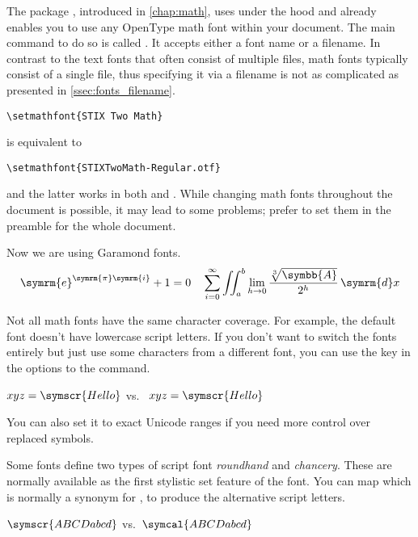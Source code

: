 The package , introduced in \autoref{chap:math}, uses
 under the hood and already enables you to use any OpenType math
font within your document. The main command to do so is called
. It accepts either a font name or a filename. In contrast to
the text fonts that often consist of multiple files, math fonts typically
consist of a single file, thus specifying it via a filename is not as
complicated as presented in \autoref{ssec:fonts_filename}.
\begin{code}
  \begin{verbatim}
\setmathfont{STIX Two Math}
  \end{verbatim}
\end{code}
is equivalent to
\begin{code}
  \begin{verbatim}
\setmathfont{STIXTwoMath-Regular.otf}
  \end{verbatim}
\end{code}
and the latter works in both  and . While
changing math fonts throughout the document is possible, it may lead to some
problems; prefer to set them in the preamble for the whole document.
\begin{example}
\setoperatorfont\symrm%
\setmainfont{Garamond Libre}
Now we are using Garamond fonts.
\[
  \symrm{e}^{\symrm{\pi}
    \symrm{i}} + 1 = 0 \quad
  \sum_{i=0}^\infty \iint_a^b
  \lim_{h\to0}\frac{\sqrt[3]{
    \symbb{A}}}{2^h}\,\symrm{d}x
\]
\end{example}

Not all math fonts have the same character coverage. For example, the default
font doesn't have lowercase script letters. If you don't want to switch the
fonts entirely but just use some characters from a different font, you
can use the  key in the options to the  command.
\begin{example}
\(xyz = \symscr{Hello}\) vs.\
\(xyz = \symscr{Hello}\)
\end{example}
You can also set it to exact Unicode ranges if you need more control over
replaced symbols.

Some fonts define two types of script font \emph{roundhand} and \emph{chancery}. These are
normally available as the first stylistic set feature of the font. You can map
\csi{symcal} which is normally a synonym for \csi{symscr}, to produce the
alternative script letters.
\begin{example}

\(\symscr{ABCDabcd}\) vs.\
\(\symcal{ABCDabcd}\) 
\end{example}

